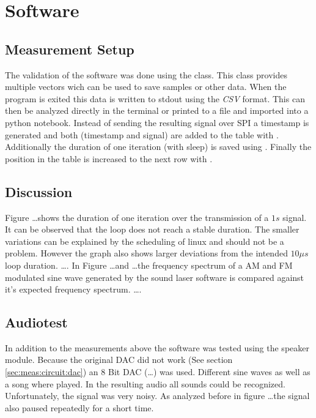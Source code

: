 \section{Software}

\subsection{Measurement Setup}

The validation of the software was done using the  class. This class provides multiple vectors wich can be used to save samples or other data. When the program is exited this data is written to stdout using the \textit{CSV} format. This can then be analyzed directly in the terminal or printed to a file and imported into a python notebook.\p
%
Instead of sending the resulting signal over SPI a timestamp is generated and both (timestamp and signal) are added to the table with . Additionally the duration of one iteration (with sleep) is saved using . Finally the position in the table is increased to the next row with .

\subsection{Discussion}

Figure \dots shows the duration of one iteration over the transmission of a $1s$ signal. It can be observed that the loop does not reach a stable duration. The smaller variations can be explained by the scheduling of linux and should not be a problem. However the graph also shows larger deviations from the intended $10\mu s$ loop duration. \dots.
%
In Figure \dots and \dots the frequency spectrum of a AM and FM modulated sine wave generated by the sound laser software is compared against it's expected frequency spectrum. \dots.
%
\subsection{Audiotest}

In addition to the measurements above the software was tested using the speaker module. Because the original DAC did not work (See section \ref{sec:meas:circuit:dac}) an 8 Bit DAC (\dots) was used. Different sine waves as well as a song where played. In the resulting audio all sounds could be recognized. Unfortunately, the signal was very noisy. As analyzed before in figure \dots the signal also paused repeatedly for a short time.
